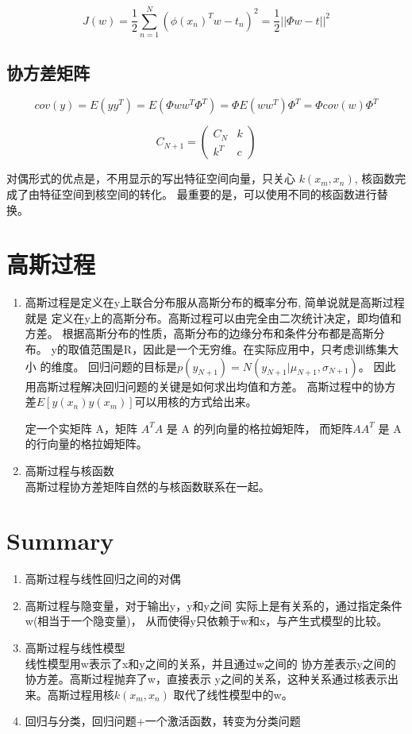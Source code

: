 \begin{equation}
J(w) = \frac{1}{2}\sum_{n=1}^N(\phi(x_n)^Tw - t_n)^2
= \frac{1}{2}||\Phi w - t||^2
\end{equation}

\subsection{协方差矩阵}

\begin{equation}
cov(y) = E(yy^T) = E(\Phi ww^T\Phi^T)
= \Phi E(ww^T) \Phi^T
= \Phi cov(w)\Phi^T
\end{equation}

\begin{equation}
C_{N+1} = \begin{pmatrix}
C_N & k\\
k^T & c
\end{pmatrix}
\end{equation}

对偶形式的优点是，不用显示的写出特征空间向量，只关心
$k(x_m, x_n)$, 核函数完成了由特征空间到核空间的转化。
最重要的是，可以使用不同的核函数进行替换。

\section{高斯过程}
\begin{enumerate}
\item 高斯过程是定义在y上联合分布服从高斯分布的概率分布,
简单说就是高斯过程就是
定义在y上的高斯分布。高斯过程可以由完全由二次统计决定，即均值和方差。
根据高斯分布的性质，高斯分布的边缘分布和条件分布都是高斯分布。
y的取值范围是R，因此是一个无穷维。在实际应用中，只考虑训练集大小
的维度。
回归问题的目标是$p(y_{N+1}) = N(y_{N+1}|\mu_{N+1}, \sigma_{N+1})$。
因此用高斯过程解决回归问题的关键是如何求出均值和方差。
高斯过程中的协方差$E[y(x_n)y(x_m)]$可以用核的方式给出来。

定一个实矩阵 A，矩阵 $A^TA$ 是 A 的列向量的格拉姆矩阵，
而矩阵$AA^T$ 是 A 的行向量的格拉姆矩阵。
\item 高斯过程与核函数\\
高斯过程协方差矩阵自然的与核函数联系在一起。

\end{enumerate}
\section{Summary}
\begin{enumerate}
\item 高斯过程与线性回归之间的对偶
\item 高斯过程与隐变量，对于输出y，y和y之间
实际上是有关系的，通过指定条件w(相当于一个隐变量)，
从而使得y只依赖于w和x，与产生式模型的比较。
\item 高斯过程与线性模型\\
线性模型用w表示了x和y之间的关系，并且通过w之间的
协方差表示y之间的协方差。高斯过程抛弃了w，直接表示
y之间的关系，这种关系通过核表示出来。高斯过程用核$k(x_m,x_n)$
取代了线性模型中的w。
\item 回归与分类，回归问题+一个激活函数，转变为分类问题
\end{enumerate}


